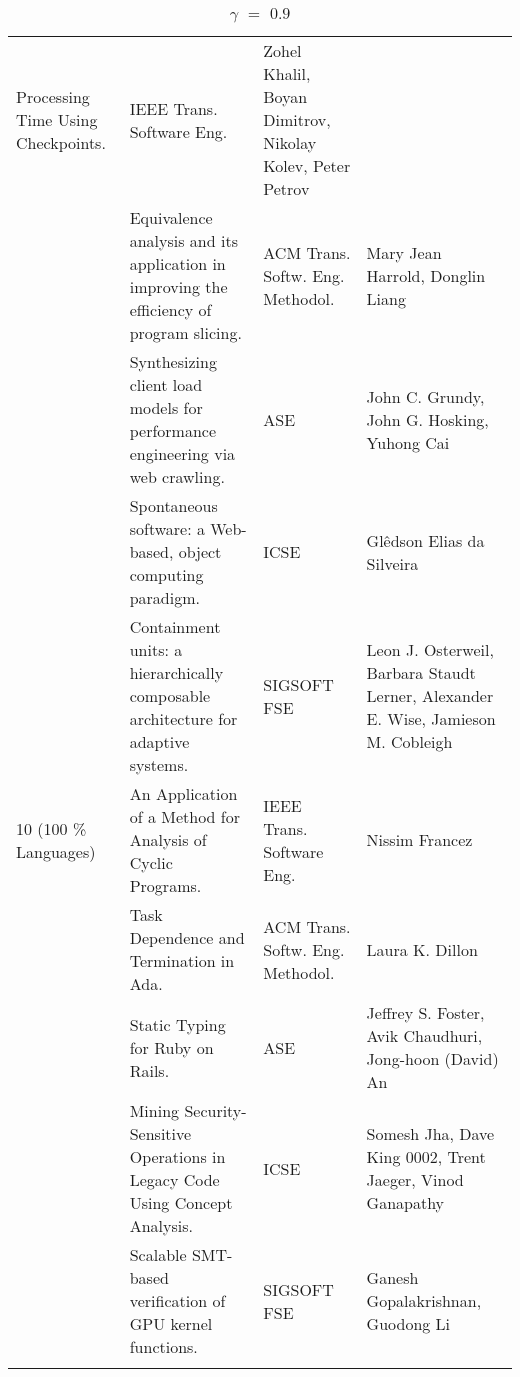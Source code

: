 \begin{center}
\begin{longtable}{|p{}p{}p{}p{}|}
Processing Time Using 
Checkpoints.& IEEE Trans. Software Eng.& Zohel Khalil, Boyan Dimitrov, Nikolay Kolev, Peter Petrov 
\\
 & Equivalence analysis and its application in improving the efficiency of program slicing.& ACM 
Trans. Softw. Eng. Methodol.& Mary Jean Harrold, Donglin Liang \\
\rowcolor{black!20} & Synthesizing client load models for performance engineering via web crawling.& 
ASE& John C. Grundy, John G. Hosking, Yuhong Cai \\
 & Spontaneous software: a Web-based, object computing paradigm.& ICSE& Glêdson Elias da Silveira \\
\rowcolor{black!20} & Containment units: a hierarchically composable architecture for adaptive 
systems.& SIGSOFT FSE& Leon J. Osterweil, Barbara Staudt Lerner, Alexander E. Wise, Jamieson M. 
Cobleigh \\
10 (100 \% Languages) & An Application of a Method for Analysis of Cyclic Programs.& IEEE Trans. 
Software 
Eng.& Nissim Francez \\
\rowcolor{black!20} & Task Dependence and Termination in Ada.& ACM Trans. Softw. Eng. Methodol.& 
Laura K. Dillon \\
 & Static Typing for Ruby on Rails.& ASE& Jeffrey S. Foster, Avik Chaudhuri, Jong-hoon (David) An \\
\rowcolor{black!20} & Mining Security-Sensitive Operations in Legacy Code Using Concept Analysis.& 
ICSE& Somesh Jha, Dave King 0002, Trent Jaeger, Vinod Ganapathy \\
 & Scalable SMT-based verification of GPU kernel functions.& SIGSOFT FSE& Ganesh Gopalakrishnan, 
Guodong Li \\
    \hline
    \caption{$\gamma$ $=$ $0.9$}
\end{longtable}
\end{center}
